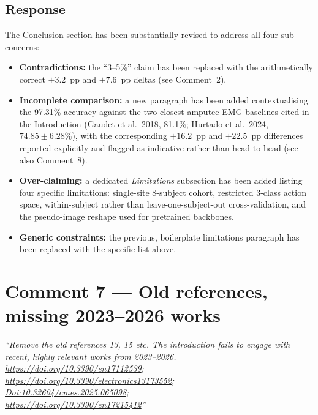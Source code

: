 \documentclass[11pt,a4paper]{article}
\begin{document}
\subsection*{Response}
The Conclusion section has been substantially revised to address all four sub-concerns:
\begin{itemize}
  \item \textbf{Contradictions:} the ``3--5\%'' claim has been replaced with the arithmetically correct $+3.2$~pp and $+7.6$~pp deltas (see Comment~2).
  \item \textbf{Incomplete comparison:} a new paragraph has been added contextualising the 97.31\% accuracy against the two closest amputee-EMG baselines cited in the Introduction (Gaudet et al.~2018, 81.1\%; Hurtado et al.~2024, $74.85 \pm 6.28\%$), with the corresponding $+16.2$~pp and $+22.5$~pp differences reported explicitly and flagged as indicative rather than head-to-head (see also Comment~8).
  \item \textbf{Over-claiming:} a dedicated \emph{Limitations} subsection has been added listing four specific limitations: single-site 8-subject cohort, restricted 3-class action space, within-subject rather than leave-one-subject-out cross-validation, and the pseudo-image reshape used for pretrained backbones.
  \item \textbf{Generic constraints:} the previous, boilerplate limitations paragraph has been replaced with the specific list above.
\end{itemize}

\section*{Comment 7 — Old references, missing 2023--2026 works}
\textit{``Remove the old references 13, 15 etc. The introduction fails to engage with recent, highly relevant works from 2023--2026. \\
\url{https://doi.org/10.3390/en17112539}; \\
\url{https://doi.org/10.3390/electronics13173552}; \\
\url{Doi:10.32604/cmes.2025.065098}; \\
\url{https://doi.org/10.3390/en17215412}''}
\end{document}
